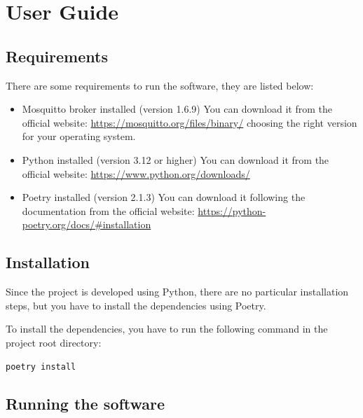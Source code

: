 \documentclass{scrartcl}
\begin{document}
\newpage
\section{User Guide}\label{user-guide}
\subsection{Requirements}\label{user-guide-requirements}
There are some requirements to run the software, they are listed below:
\begin{itemize}
      \item Mosquitto broker installed (version 1.6.9)
            You can download it from the official website: \url{https://mosquitto.org/files/binary/} 
            choosing the right version for your operating system.
      \item Python installed (version 3.12 or higher)
            You can download it from the official website: \url{https://www.python.org/downloads/}
      \item Poetry installed (version 2.1.3)
            You can download it following the documentation from the official website: 
            \url{https://python-poetry.org/docs/#installation}
\end{itemize}

\subsection{Installation}\label{installation}
Since the project is developed using Python, there are no particular installation steps, but you 
have to install the dependencies using Poetry.

To install the dependencies, you have to run the following command in the project root directory:
\begin{verbatim}
poetry install
\end{verbatim}

\subsection{Running the software}\label{running-the-software}
\end{document}
